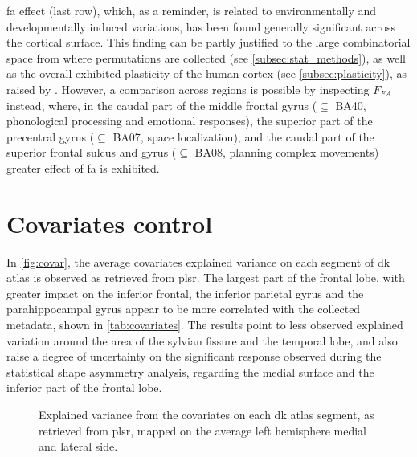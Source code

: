 \Ac{fa} effect (last row), which, as a reminder, is related to environmentally and developmentally induced variations, has been found generally significant across the cortical surface. This finding can be partly justified to the large combinatorial space from where permutations are collected (see \autoref{subsec:stat_methods}), as well as the overall exhibited plasticity of the human cortex (see \autoref{subsec:plasticity}), as raised by \citet{Vanbiervliet2022}. However, a comparison across regions is possible by inspecting  $F_{FA}$ instead, where, in the caudal part of the middle frontal gyrus ($\subseteq$ BA40, phonological processing and emotional responses), the superior part of the precentral gyrus ($\subseteq$ BA07, space localization), and the caudal part of the superior frontal sulcus and gyrus ($\subseteq$ BA08, planning complex movements) greater effect of \ac{fa} is exhibited.


\section{Covariates control}
In \autoref{fig:covar}, the average covariates explained variance on each segment of \ac{dk} atlas is observed as retrieved from \ac{plsr}. The largest part of the frontal lobe, with greater impact on the inferior frontal, the inferior parietal gyrus and the parahippocampal gyrus appear to be more correlated with the collected metadata, shown in \autoref{tab:covariates}. The results point to less observed explained variation around the area of the sylvian fissure and the temporal lobe, and also raise a degree of uncertainty on the significant response observed during the statistical shape asymmetry analysis, regarding the medial surface and the inferior part of the frontal lobe.
\begin{figure}[H]

\caption[Explained variance from covariates]{Explained variance from the covariates on each \ac{dk} atlas segment, as retrieved from \ac{plsr}, mapped on the average left hemisphere medial and lateral side.}
\label{fig:covar}
\end{figure}
